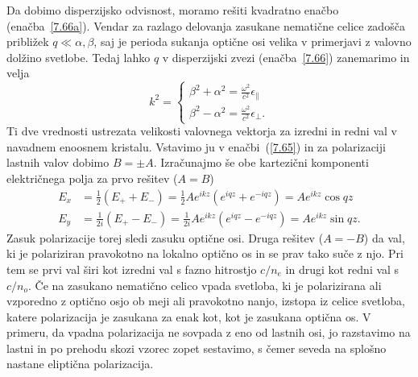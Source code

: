 Da dobimo disperzijsko odvisnost, moramo rešiti kvadratno enačbo (enačba~\ref{7.66a}). 
Vendar za razlago delovanja zasukane nematične celice zadošča približek 
$q\ll\alpha, \beta$, saj je perioda sukanja optične osi
velika v primerjavi z valovno dolžino svetlobe. Tedaj lahko $q$ v disperzijski
zvezi (enačba~\ref{7.66}) zanemarimo in velja
\begin{equation}
k^{2}=
\begin{cases}
\beta^{2}+\alpha^{2}=\frac{\omega^{2}}{c^{2}}\epsilon_{\parallel}\\
\beta^{2}-\alpha^{2}=\frac{\omega^{2}}{c^{2}}\epsilon_{\bot}.
\end{cases}
\label{7.67}
\end{equation}
Ti dve vrednosti ustrezata velikosti valovnega vektorja za izredni
in redni val v navadnem enoosnem kristalu. Vstavimo ju v enačbi~(\ref{7.65})
in za polarizaciji lastnih valov dobimo $B=\pm A$.
Izračunajmo še obe kartezični komponenti električnega polja za prvo rešitev ($A=B$)
\begin{align}
E_{x} &=  \frac{1}{2}(E_{+}+E_{-})  =  \frac{1}{2}Ae^{ikz}(e^{iqz}+e^{-iqz})  =  Ae^{ikz}\cos qz\\
E_{y} & = \frac{1}{2i}(E_{+}-E_{-})  =  \frac{1}{2i}Ae^{ikz}(e^{iqz}-e^{-iqz})  =  Ae^{ikz}\sin qz.
\label{7.68}
\end{align}
Zasuk polarizacije torej sledi zasuku optične osi. Druga rešitev ($A=-B$) da val,
ki je polariziran pravokotno na lokalno optično os in se prav tako
suče z njo. Pri tem se prvi val širi kot izredni val s fazno hitrostjo $c/n_{e}$ in  
drugi kot redni val s $c/n_{o}$. Če na zasukano
nematično celico vpada svetloba, ki je polarizirana ali vzporedno z 
optično osjo ob meji ali pravokotno nanjo, izstopa iz celice svetloba, katere 
polarizacija je zasukana za enak kot, kot je zasukana optična os. 
V primeru, da vpadna polarizacija ne sovpada z eno od
lastnih osi, jo razstavimo na lastni in po prehodu skozi
vzorec zopet sestavimo, s čemer seveda na splošno nastane eliptična
polarizacija.

